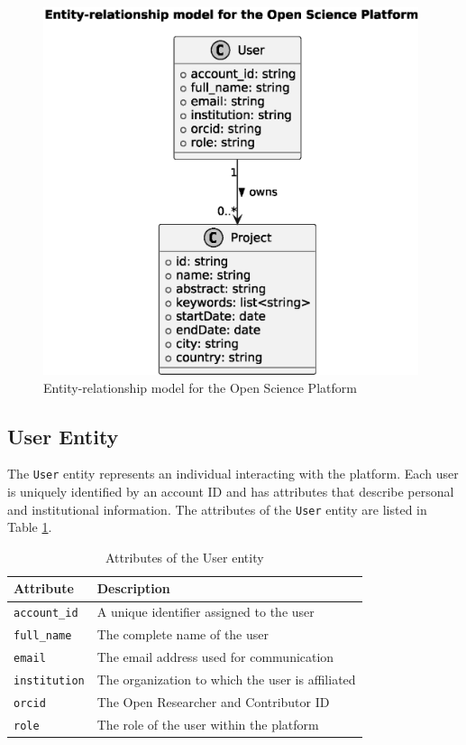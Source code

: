 \documentclass{article}
\begin{document}
\begin{figure}[htbp]
    \centering
    \includegraphics[width=0.98\textwidth, keepaspectratio]{entity_relationship_model.eps}
    \caption{Entity-relationship model for the Open Science Platform}
    \label{fig:er_model}
\end{figure}



\subsection{User Entity}
The \texttt{User} entity represents an individual interacting with the platform. Each user is uniquely identified by an account ID and has attributes that describe personal and institutional information. The attributes of the \texttt{User} entity are listed in Table \ref{tab:user_attributes}.

\begin{table}[h]
    \centering
    \caption{Attributes of the User entity}
    \label{tab:user_attributes}
    \begin{tabular}{|l|l|}
        \hline
        \textbf{Attribute}   & \textbf{Description}                             \\ \hline
        \texttt{account\_id} & A unique identifier assigned to the user         \\ \hline
        \texttt{full\_name}  & The complete name of the user                    \\ \hline
        \texttt{email}       & The email address used for communication         \\ \hline
        \texttt{institution} & The organization to which the user is affiliated \\ \hline
        \texttt{orcid}       & The Open Researcher and Contributor ID           \\ \hline
        \texttt{role}        & The role of the user within the platform         \\ \hline
    \end{tabular}
\end{table}
\end{document}
